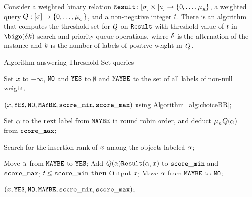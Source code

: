 \begin{theorem}\label{th:threshold-set}
  Consider a weighted binary relation
  $\hbox{\tt Result}:[\sigma]\times[n]\rightarrow\{0,\ldots,\mu_{_{R}}\}$,
  a weighted query
  $Q:[\sigma]\rightarrow\{0,\ldots,\mu_{_{Q}}\}$, and a
  non-negative integer $t$.
  There is an algorithm that computes the threshold set for $Q$ on
  $\hbox{\tt Result}$ with threshold-value of $t$ in $\bigo(\difficulty\nbkeywords)$
  search and priority queue operations, where
  $\delta$ is the alternation of the instance and
  $k$ is the number of labels of positive weight in~$Q$.
\end{theorem}

  \begin{algorithm}
    \centering
    \caption{Algorithm  answering Threshold Set queries }
    \label{alg:ThresholdOnBinRel}
    \begin{algorithmic}
      \STATE Set $x$ to $-\infty$, 
      $\mathtt{NO}$ and $\mathtt{YES}$ to $\emptyset$
      and $\mathtt{MAYBE}$ to the set of all labels of non-null weight;

      \STATE {}$(x,\mathtt{YES},\mathtt{NO},\mathtt{MAYBE},\mathtt{score\_min},\mathtt{score\_max})$ 
      using Algorithm~\ref{alg:choiceBR};

      \WHILE{$\objectx<\infty$}

        \STATE Set $\alpha$ to the next label from $\mathtt{MAYBE}$ in round
        robin order, and deduct $\mu_{_{R}}Q(\alpha)$ from
        $\mathtt{score\_max}$;

        \STATE Search for the insertion rank of $x$ among the
        objects labeled $\alpha$;

          \STATE Move $\alpha$ from $\mathtt{MAYBE}$ to $\mathtt{YES}$;
          \STATE Add $Q(\alpha)\hbox{\tt Result}(\alpha,x)$ to
          $\mathtt{score\_min}$ and $\mathtt{score\_max}$;
           {$t\leq\mathtt{score\_min}$} 
                 {\bf then } Output $x$;
        \ELSE    
          \STATE Move $\alpha$ from $\mathtt{MAYBE}$ to $\mathtt{NO}$;
        \ENDIF

           \STATE {}$(x,\mathtt{YES},\mathtt{NO},\mathtt{MAYBE},\mathtt{score\_min},\mathtt{score\_max})$;
        \ENDIF

      \ENDWHILE
    \end{algorithmic}
  \end{algorithm}

